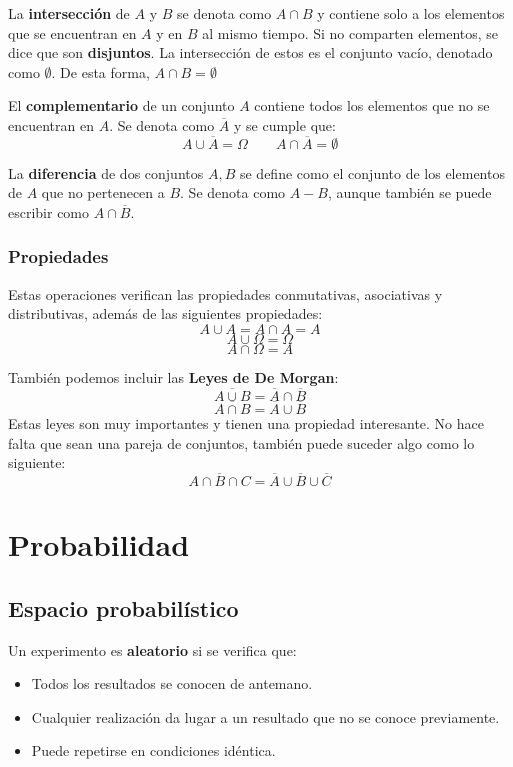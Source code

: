 \documentclass[a4paper]{book}
\begin{document}
\begin{definicion}
	La \textbf{intersección} de $A$ y $B$ se denota como $A\cap B$ y contiene solo a los elementos que se encuentran en $A$ y en $B$ al mismo tiempo. Si no comparten elementos, se dice que son \textbf{disjuntos}. La intersección de estos es el conjunto vacío, denotado como $\emptyset$. De esta forma, $A\cap B = \emptyset$
\end{definicion}

\begin{definicion}
	El \textbf{complementario} de un conjunto $A$ contiene todos los elementos que no se encuentran en $A$. Se denota como $\overline{A}$ y se cumple que: \[A \cup \overline{A} = \Omega \qquad A \cap \overline{A} = \emptyset\]
\end{definicion}

\begin{definicion}
	La \textbf{diferencia} de dos conjuntos $A, B$ se define como el conjunto de los elementos de $A$ que no pertenecen a $B$. Se denota como $A-B$, aunque también se puede escribir como $A\cap \overline{B}$.
\end{definicion}

\subsection*{Propiedades}
Estas operaciones verifican las propiedades conmutativas, asociativas y distributivas, además de las siguientes propiedades:
\[A \cup A = A \cap A = A\]
\[A\cup \Omega = \Omega \]
\[A \cap \Omega = A\]

También podemos incluir las \textbf{Leyes de De Morgan}: \[\overline{A\cup B} = \overline{A} \cap \overline{B}\]
\[\overline{A\cap B} = \overline{A} \cup \overline{B}\]
Estas leyes son muy importantes y tienen una propiedad interesante. No hace falta que sean una pareja de conjuntos, también puede suceder algo como lo siguiente: \[\overline{A\cap B \cap C} = \overline{A} \cup \overline{B} \cup \overline{C}\]

\chapter{Probabilidad}


\section{Espacio probabilístico}
\begin{definicion}
	Un experimento es \textbf{aleatorio} si se verifica que: \begin{itemize}
		\item Todos los resultados se conocen de antemano.
		\item Cualquier realización da lugar a un resultado que no se conoce previamente.
		\item Puede repetirse en condiciones idéntica.
	\end{itemize}
\end{definicion}
\end{document}
